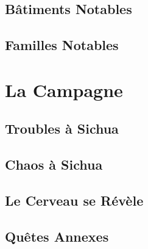 \documentclass{dd}
\begin{document}
\chapter{Bâtiments Notables}

















\chapter{Familles Notables}



\part{La Campagne}


\chapter{Troubles à Sichua}



\chapter{Chaos à Sichua}


\chapter{Le Cerveau se Révèle}


\chapter{Quêtes Annexes}


\end{document}
